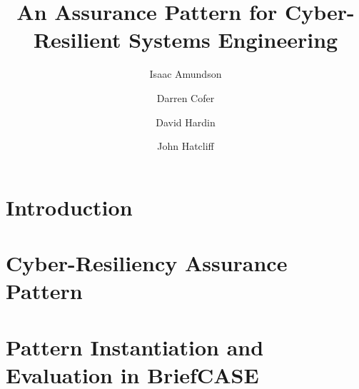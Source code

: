 \documentclass[runningheads]{llncs}
\begin{document}
\title{An Assurance Pattern for Cyber-Resilient Systems Engineering}

\author{
	Isaac Amundson 
	\and Darren Cofer 
	\and David Hardin 
	\and John Hatcliff}



\maketitle

\begin{abstract}

\end{abstract}

\section{Introduction}
\label{sec:introduction}


%

\section{Cyber-Resiliency Assurance Pattern}
\label{sec:assurance-pattern}


\section{Pattern Instantiation and Evaluation in BriefCASE}
\label{sec:evaluation}

\end{document}
